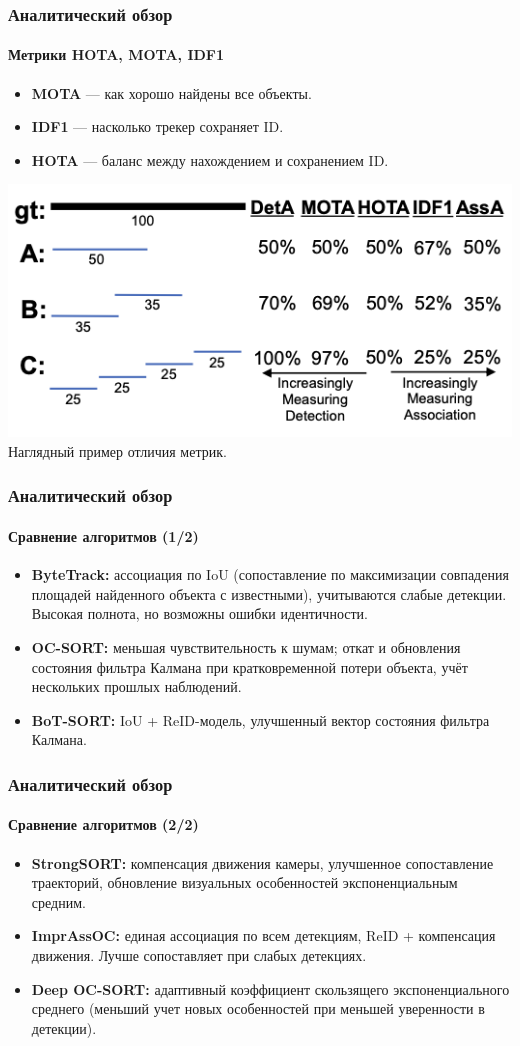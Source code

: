 \documentclass{beamer} %
\begin{document}
\begin{frame}
  \frametitle{Аналитический обзор}
  \framesubtitle{Метрики HOTA, MOTA, IDF1}
  \begin{itemize}
    \item \textbf{MOTA} — как хорошо найдены все объекты.
    \item \textbf{IDF1} — насколько трекер сохраняет ID.
    \item \textbf{HOTA} — баланс между нахождением и сохранением ID.
  \end{itemize}
  \centering
  \includegraphics[width=0.7\linewidth]{images/presentation/metrics.png}\\
  \small Наглядный пример отличия метрик.
\end{frame}

\begin{frame}
  \frametitle{Аналитический обзор}
  \framesubtitle{Сравнение алгоритмов (1/2)}
  \begin{itemize}
    \item \textbf{ByteTrack:} ассоциация по IoU (сопоставление по максимизации совпадения площадей найденного объекта с известными), учитываются слабые детекции. Высокая полнота, но возможны ошибки идентичности.
    \item \textbf{OC-SORT:} меньшая чувствительность к шумам; откат и обновления состояния фильтра Калмана при кратковременной потери объекта, учёт нескольких прошлых наблюдений.
    \item \textbf{BoT-SORT:} IoU + ReID-модель, улучшенный вектор состояния фильтра Калмана.
  \end{itemize}
\end{frame}
\begin{frame}
  \frametitle{Аналитический обзор}
  \framesubtitle{Сравнение алгоритмов (2/2)}
  \begin{itemize}
    \item \textbf{StrongSORT:} компенсация движения камеры, улучшенное сопоставление траекторий, обновление визуальных особенностей экспоненциальным средним.
    \item \textbf{ImprAssOC:} единая ассоциация по всем детекциям, ReID + компенсация движения. Лучше сопоставляет при слабых детекциях.
    \item \textbf{Deep OC-SORT:} адаптивный коэффициент скользящего экспоненциального среднего (меньший учет новых особенностей при меньшей уверенности в детекции).
  \end{itemize}
\end{frame}
\end{document}

